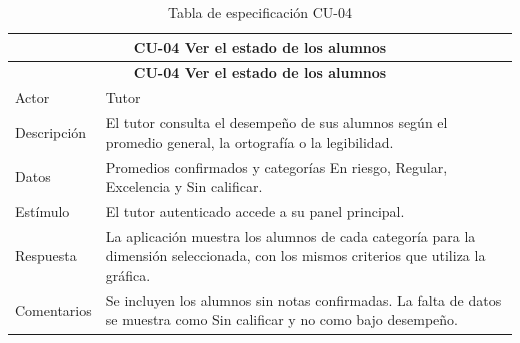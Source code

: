 
\begin{longtable}{|p{4cm}|p{11cm}|}
\caption{Tabla de especificación CU-04}
\label{tab:cu04} \\

\hline
\multicolumn{2}{|c|}{\textbf{CU-04 Ver el estado de los alumnos}} \\
\hline
\endfirsthead

\hline
\multicolumn{2}{|c|}{\textbf{CU-04 Ver el estado de los alumnos}} \\
\hline
\endhead

\hline
\endfoot
\endlastfoot

Actor & Tutor \\
\hline
Descripción & El tutor consulta el desempeño de sus alumnos según el promedio general, la ortografía o la legibilidad. \\
\hline
Datos & Promedios confirmados y categorías En riesgo, Regular, Excelencia y Sin calificar. \\
\hline
Estímulo & El tutor autenticado accede a su panel principal. \\
\hline
Respuesta & La aplicación muestra los alumnos de cada categoría para la dimensión seleccionada, con los mismos criterios que utiliza la gráfica. \\
\hline
Comentarios & Se incluyen los alumnos sin notas confirmadas. La falta de datos se muestra como Sin calificar y no como bajo desempeño. \\
\hline

\end{longtable}


